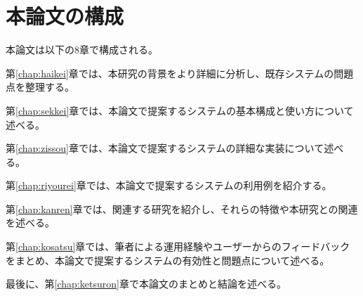 \newpage

\section{本論文の構成}

本論文は以下の8章で構成される。

第\ref{chap:haikei}章では、本研究の背景をより詳細に分析し、既存システムの問題点を整理する。

第\ref{chap:sekkei}章では、本論文で提案するシステムの基本構成と使い方について述べる。

第\ref{chap:zissou}章では、本論文で提案するシステムの詳細な実装について述べる。

第\ref{chap:riyourei}章では、本論文で提案するシステムの利用例を紹介する。

第\ref{chap:kanren}章では、関連する研究を紹介し、それらの特徴や本研究との関連を述べる。

第\ref{chap:kosatsu}章では、筆者による運用経験やユーザーからのフィードバックをまとめ、本論文で提案するシステムの有効性と問題点について述べる。

最後に、第\ref{chap:ketsuron}章で本論文のまとめと結論を述べる。